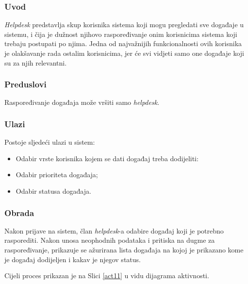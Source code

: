 \documentclass[12pt,a4paper]{article}
\begin{document}
\subsubsection{Uvod}

\textit{Helpdesk} predstavlja skup korisnika sistema koji mogu pregledati sve događaje u sistemu, i čija je dužnost njihovo raspoređivanje onim korisnicima sistema koji trebaju postupati po njima. Jedna od najvažnijih funkcionalnosti ovih korisnika je olakšavanje rada ostalim korisnicima, jer će svi vidjeti samo one događaje koji su za njih relevantni.

\subsubsection{Preduslovi}

Raspoređivanje događaja može vršiti samo \textit{helpdesk}.

\subsubsection{Ulazi}

Postoje sljedeći ulazi u sistem:

\begin{itemize}
\item Odabir vrste korisnika kojem se dati događaj treba dodijeliti:
\item Odabir prioriteta događaja;
\item Odabir statusa događaja.
\end{itemize}

\subsubsection{Obrada}

Nakon prijave na sistem, član \textit{helpdesk}-a odabire događaj koji je potrebno rasporediti. Nakon unosa neophodnih podataka i pritiska na dugme za raspoređivanje, prikazuje se ažurirana lista događaja na kojoj je prikazano kome je događaj dodijeljen i kakav je njegov status.

Cijeli proces prikazan je na Slici \ref{act11} u vidu dijagrama aktivnosti.
\end{document}
